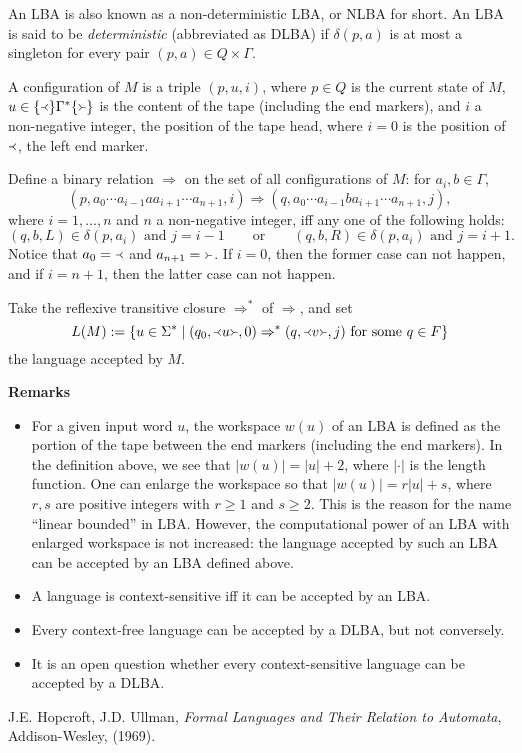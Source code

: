 \documentclass[12pt]{article}
\begin{document}
An LBA is also known as a non-deterministic LBA, or NLBA for short.  An LBA is said to be \emph{deterministic} (abbreviated as DLBA) if $\delta(p,a)$ is at most a singleton for every pair $(p,a)\in Q\times \Gamma$.

A configuration of $M$ is a triple $(p,u,i)$, where $p\in Q$ is the current state of $M$, $u\in \lbrace \Yleft \rbrace \Gamma^* \lbrace \Yright \rbrace$ is the content of the tape (including the end markers), and $i$ a non-negative integer, the position of the tape head, where $i=0$ is the position of $\Yleft$, the left end marker.

Define a binary relation $\Rightarrow$ on the set of all configurations of $M$: for $a_i,b\in \Gamma$,
$$(p,a_0\cdots a_{i-1} a a_{i+1} \cdots a_{n+1},i)\Rightarrow (q,a_0 \cdots a_{i-1} b a_{i+1} \cdots a_{n+1},j),$$ 
where $i=1,\ldots,n$ and $n$ a non-negative integer, iff any one of the following holds: 
$$(q,b,L)\in \delta(p,a_i)\mbox{ and }j=i-1 \qquad \mbox{or} \qquad (q,b,R)\in \delta(p,a_i)\mbox{ and }j=i+1.$$
Notice that $a_0=\Yleft$ and $a_{n+1}=\Yright$.  If $i=0$, then the former case can not happen, and if $i=n+1$, then the latter case can not happen.

Take the reflexive transitive closure $\Rightarrow^*$ of $\Rightarrow$, and set $$L(M):=\lbrace u\in \Sigma^* \mid (q_0,\Yleft u \Yright, 0)\Rightarrow^* (q,\Yleft v \Yright,j) \mbox{ for some } q\in F\rbrace$$ the language accepted by $M$.

\textbf{Remarks}
\begin{itemize}
\item For a given input word $u$, the workspace $w(u)$ of an LBA is defined as the portion of the tape between the end markers (including the end markers).  In the definition above, we see that $|w(u)|=|u|+2$, where $|\cdot|$ is the length function.  One can enlarge the workspace so that $|w(u)|=r|u|+s$, where $r,s$ are positive integers with $r\ge 1$ and $s\ge 2$.  This is the reason for the name ``linear bounded'' in LBA.  However, the computational power of an LBA with enlarged workspace is not increased: the language accepted by such an LBA can be accepted by an LBA defined above.
\item A language is context-sensitive iff it can be accepted by an LBA.
\item Every context-free language can be accepted by a DLBA, but not conversely.
\item It is an open question whether every context-sensitive language can be accepted by a DLBA.
\end{itemize}

\begin{thebibliography}{9}
 J.E. Hopcroft, J.D. Ullman, {\em Formal Languages and Their Relation to Automata}, Addison-Wesley, (1969).
\end{thebibliography}
\end{document}
